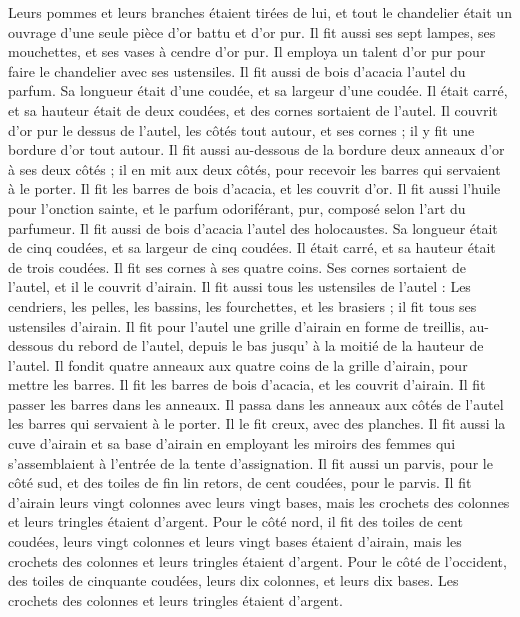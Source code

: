 \begin{multicols}{2}
Leurs pommes et leurs branches étaient tirées de lui, et tout le chandelier était un ouvrage d'une seule pièce d’or battu et d’or pur.
Il fit aussi ses sept lampes, ses mouchettes, et ses vases à cendre d’or pur.
Il employa un talent d’or pur pour faire le chandelier avec ses ustensiles.
Il fit aussi de bois d’acacia l'autel du parfum. Sa longueur était d'une coudée, et sa largeur d'une coudée. Il était carré, et sa hauteur était de deux coudées, et des cornes sortaient de l’autel\FTNT{}.
Il couvrit d’or pur le dessus de l'autel, les côtés tout autour, et ses cornes ; il y fit une bordure d’or tout autour.
Il fit aussi au-dessous de la bordure deux anneaux d'or à ses deux côtés ; il en mit aux deux côtés, pour recevoir les barres qui servaient à le porter.
Il fit les barres de bois d’acacia, et les couvrit d'or.
Il fit aussi l'huile pour l'onction sainte, et le parfum odoriférant, pur, composé selon l’art du parfumeur.
\VerseOne{}Il fit aussi de bois d’acacia l'autel des holocaustes. Sa longueur était de cinq coudées, et sa largeur de cinq coudées. Il était carré, et sa hauteur était de trois coudées\FTNT{}.
Il fit ses cornes à ses quatre coins. Ses cornes sortaient de l’autel, et il le couvrit d'airain.
Il fit aussi tous les ustensiles de l'autel : Les cendriers, les pelles, les bassins, les fourchettes, et les brasiers ; il fit tous ses ustensiles d'airain.
Il fit pour l'autel une grille d'airain en forme de treillis, au-dessous du rebord de l'autel, depuis le bas jusqu’ à la moitié de la hauteur de l’autel.
Il fondit quatre anneaux aux quatre coins de la grille d'airain, pour mettre les barres.
Il fit les barres de bois d’acacia, et les couvrit d'airain.
Il fit passer les barres dans les anneaux. Il passa dans les anneaux aux côtés de l’autel les barres qui servaient à le porter. Il le fit creux, avec des planches.
Il fit aussi la cuve d'airain et sa base d'airain en employant les miroirs des femmes qui s’assemblaient à l’entrée de la tente d'assignation\FTNT{}.
Il fit aussi un parvis, pour le côté sud, et des toiles de fin lin retors, de cent coudées, pour le parvis.
Il fit d'airain leurs vingt colonnes avec leurs vingt bases, mais les crochets des colonnes et leurs tringles étaient d'argent.
Pour le côté nord, il fit des toiles de cent coudées, leurs vingt colonnes et leurs vingt bases étaient d'airain, mais les crochets des colonnes et leurs tringles étaient d'argent.
Pour le côté de l'occident, des toiles de cinquante coudées, leurs dix colonnes, et leurs dix bases. Les crochets des colonnes et leurs tringles étaient d'argent.

\end{multicols}
